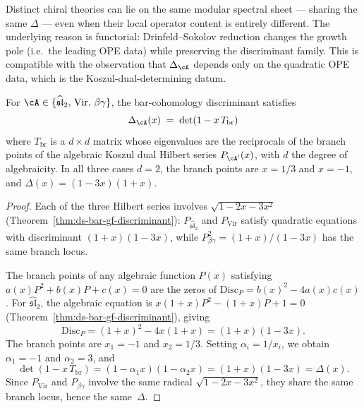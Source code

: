 Distinct chiral theories can lie on the same modular spectral
sheet --- sharing the same $\Delta$ --- even when their local
operator content is entirely different.  The underlying reason
is functorial: Drinfeld--Sokolov reduction changes the growth pole
(i.e.\ the leading OPE data) while preserving the discriminant
family.  This is compatible with the observation that
$\Delta_{\cA}$ depends only on the quadratic OPE data, which is
the Koszul-dual-determining datum.

\begin{theorem}
\label{thm:discriminant-spectral-verified}
For $\cA \in \{\widehat{\mathfrak{sl}}_2,\, \mathrm{Vir},\,
\beta\gamma\}$, the bar-cohomology discriminant satisfies
\[
\Delta_{\cA}(x) \;=\; \det(1 - x\, T_{\mathrm{br}})
\]
where $T_{\mathrm{br}}$ is a $d \times d$ matrix whose eigenvalues
are the reciprocals of the branch points of the algebraic Koszul
dual Hilbert series $P_{\cA^!}(x)$, with $d$ the degree of
algebraicity.
In all three cases $d = 2$, the branch points are $x = 1/3$
and $x = -1$, and
$\Delta(x) = (1 - 3x)(1 + x)$.
\end{theorem}

\begin{proof}
Each of the three Hilbert series involves $\sqrt{1 - 2x - 3x^2}$
(Theorem~\ref{thm:ds-bar-gf-discriminant}):
$P_{\widehat{\mathfrak{sl}}_2}$ and $P_{\mathrm{Vir}}$ satisfy
quadratic equations with discriminant $(1+x)(1-3x)$, while
$P_{\beta\gamma}^2 = (1+x)/(1-3x)$ has the same branch locus.

The branch points of any algebraic function $P(x)$ satisfying
$a(x)P^2 + b(x)P + c(x) = 0$ are the zeros of
$\mathrm{Disc}_P = b(x)^2 - 4a(x)c(x)$.  For
$\widehat{\mathfrak{sl}}_2$, the algebraic equation is
$x(1+x)P^2 - (1+x)P + 1 = 0$
(Theorem~\ref{thm:ds-bar-gf-discriminant}), giving
\[
\mathrm{Disc}_P = (1+x)^2 - 4x(1+x) = (1+x)(1-3x).
\]
The branch points are $x_1 = -1$ and $x_2 = 1/3$.
Setting $\alpha_i = 1/x_i$, we obtain $\alpha_1 = -1$ and
$\alpha_2 = 3$, and
\[
\det(1 - x\,T_{\mathrm{br}}) = (1 - \alpha_1 x)(1 - \alpha_2 x)
= (1+x)(1-3x) = \Delta(x).
\]
Since $P_{\mathrm{Vir}}$ and $P_{\beta\gamma}$ involve the same
radical $\sqrt{1-2x-3x^2}$, they share the same branch locus,
hence the same~$\Delta$.
\end{proof}

